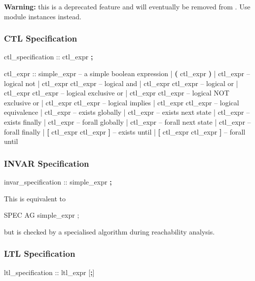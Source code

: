 \textbf{Warning:} this is a deprecated feature and will eventually be removed from \nusmv. Use module instances instead.


\subsubsection{CTL Specification}
\begin{Grammar}
ctl_specification ::  ctl_expr \textbf{;}
\end{Grammar}

\begin{Grammar}
ctl_expr ::
    simple_expr                 -- a simple boolean expression
    | \textbf{(} ctl_expr \textbf{)}
    | \operator{!} ctl_expr                -- logical not
    | ctl_expr \operator{\&} ctl_expr       -- logical and
    | ctl_expr \operator{|} ctl_expr       -- logical or
    | ctl_expr  ctl_expr     -- logical exclusive or
    | ctl_expr  ctl_expr    -- logical NOT exclusive or
    | ctl_expr \operator{->} ctl_expr      -- logical implies
    | ctl_expr \operator{<->} ctl_expr     -- logical equivalence
    |  ctl_expr               -- exists globally
    |  ctl_expr               -- exists next state
    |  ctl_expr               -- exists finally
    |  ctl_expr               -- forall globally
    |  ctl_expr               -- forall next state
    |  ctl_expr               -- forall finally
    |  \textbf{[} ctl_expr  ctl_expr \textbf{]} -- exists until
    |  \textbf{[} ctl_expr  ctl_expr \textbf{]} -- forall until
\end{Grammar}


\subsubsection{INVAR Specification}
\begin{Grammar}
invar_specification ::  simple_expr \textbf{;}
\end{Grammar}

This is equivalent to 
%
\begin{Grammar}
SPEC  AG simple_expr ;
\end{Grammar}
%
but is checked by a specialised algorithm during reachability analysis.


\subsubsection{LTL Specification}
\begin{Grammar}
ltl_specification ::  ltl_expr [\textbf{;}]
\end{Grammar}

